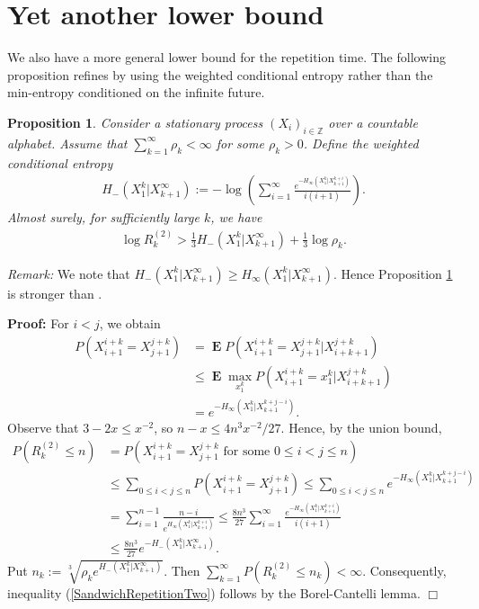 \documentclass[a4paper,12pt]{article}
\newcommand{\okra}[1]{\left( #1 \right)}
\DeclareMathOperator{\mean}{\mathbf{E}}
\newtheorem{proposition}{Proposition}
\newenvironment*{proof}{\begin{trivlist}\item[]
\noindent\textbf{Proof:}}{$\Box$\par\end{trivlist}}
\begin{document}
\section{Yet another lower bound}
\label{secYetAnother}

We also have a more general lower bound for the repetition time.  The
following proposition refines \citep[Theorem 9.25]{Debowski21} by
using the weighted conditional entropy rather than the min-entropy
conditioned on the infinite future.
\begin{proposition}
  \label{theoSandwichRepetitionTwo}
  Consider a stationary process $(X_i)_{i\in\mathbb{Z}}$ over a
  countable alphabet. Assume that $\sum_{k=1}^\infty \rho_k<\infty$
  for some $\rho_k>0$. Define the weighted conditional entropy
  \begin{align}
    H_-(X_1^k|X_{k+1}^\infty):=-\log \okra{
    \sum_{i=1}^\infty\frac{e^{-H_\infty(X_1^k|X_{k+1}^{k+i})}}{i(i+1)}}.
  \end{align}
  Almost surely, for sufficiently large $k$, we have
  \begin{align}
    \label{SandwichRepetitionTwo}
    \log R^{(2)}_k> \frac{1}{3}H_-(X_1^k|X_{k+1}^\infty)
    +\frac{1}{3}\log\rho_k
    .
  \end{align}
\end{proposition}
\emph{Remark:} We note that
$H_-(X_1^k|X_{k+1}^\infty)\ge
H_\infty(X_1^k|X_{k+1}^\infty)$. Hence Proposition
\ref{theoSandwichRepetitionTwo} is stronger than \citep[Theorem
9.25]{Debowski21}.
\begin{proof}
  For $i<j$, we obtain 
\begin{align}
  P(X_{i+1}^{i+k}=X_{j+1}^{j+k})
  &=
    \mean
    P(X_{i+1}^{i+k}=X_{j+1}^{j+k}|X_{i+k+1}^{j+k})
    \nonumber\\
  &\le
    \mean \max_{x_1^k} P(X_{i+1}^{i+k}=x_1^k|X_{i+k+1}^{j+k})
    \nonumber\\
  &=
    e^{-H_\infty(X_1^k|X_{k+1}^{k+j-i})}
    .
\end{align}
Observe that $3-2x\le x^{-2}$, so $n-x\le 4n^3x^{-2}/27$.
Hence, by the union bound,
\begin{align}
  P(R^{(2)}_k\le n)
  &= P\okra{X_{i+1}^{i+k}=X_{j+1}^{j+k} \text{ for some }
    0\le i<j\le n}
    \nonumber\\
  &\le \sum_{0\le i<j\le n} P(X_{i+1}^{i+k}=X_{j+1}^{j+k})
    \le \sum_{0\le i<j\le n}  e^{-H_\infty(X_1^k|X_{k+1}^{k+j-i})}
    \nonumber\\
  &= \sum_{i=1}^{n-1}
    \frac{n-i}{e^{H_\infty(X_1^k|X_{k+1}^{k+i})}}
    \le \frac{8n^3}{27}
    \sum_{i=1}^\infty\frac{e^{-H_\infty(X_1^k|X_{k+1}^{k+i})}}{i(i+1)}
    \nonumber\\
  &\le \frac{8n^3}{27} e^{-H_-(X_1^k|X_{k+1}^\infty)}.
\end{align}
Put $n_k:=\sqrt[3]{\rho_k e^{H_-(X_1^k|X_{k+1}^\infty)}}$. Then
$\sum_{k=1}^\infty P(R^{(2)}_k\le n_k)<\infty$.  Consequently,
inequality (\ref{SandwichRepetitionTwo}) follows by the
Borel-Cantelli lemma.
\end{proof}
\end{document}
